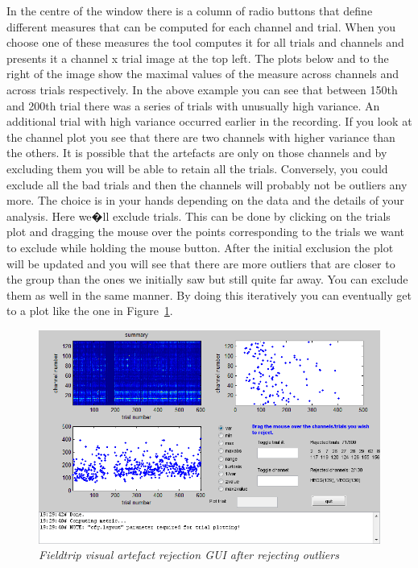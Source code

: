In the centre of the window there is a column of radio buttons that define different measures that can be computed for each channel and trial. When you choose one of these measures the tool computes it for all trials and channels and presents it a channel x trial image at the top left. The plots below and to the right of the image show the maximal values of the measure across channels and across trials respectively. In the above example you can see that between 150th and 200th trial there was a series of trials with unusually high variance. An additional trial with high variance occurred earlier in the recording. If you look at the channel plot you see that there are two channels with higher variance than the others. It is possible that the artefacts are only on those channels and by excluding them you will be able to retain all the trials. Conversely, you could exclude all the bad trials and then the channels will probably not be outliers any more. The choice is in your hands depending on the data and the details of your analysis. Here we�ll exclude trials. This can be done by clicking on the trials plot and dragging the mouse over the points corresponding to the trials we want to exclude while holding the mouse button. After the initial exclusion the plot will be updated and you will see that there are more outliers that are closer to the group than the ones we initially saw but still quite far away. You can exclude them as well in the same manner. By doing this iteratively you can eventually get to a plot like the one in Figure~\ref{artefact_fig6}.

\begin{figure}
\begin{center}
\includegraphics[width=140mm]{meeg_artefact/figure6}
\caption{\em Fieldtrip visual artefact rejection GUI after rejecting outliers\label{artefact_fig6}}
\end{center}
\end{figure}

